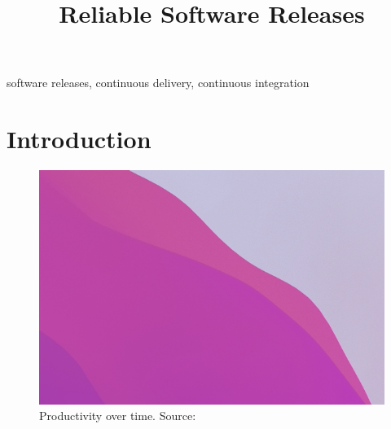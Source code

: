 \documentclass[conference]{IEEEtran}
\begin{document}
\title{Reliable Software Releases}

\author{
\and
{}
}

\maketitle

\begin{abstract}

\end{abstract}

\begin{IEEEkeywords}
software releases, continuous delivery, continuous integration
\end{IEEEkeywords}

\section{Introduction}

\begin{figure}[!ht]
    \centering
    \includegraphics[scale=0.5]{images/1.png}
    \caption{Productivity over time. Source: \cite[S.4]{martin2009clean}}
    \label{fig:productivity}
\end{figure}
\end{document}
